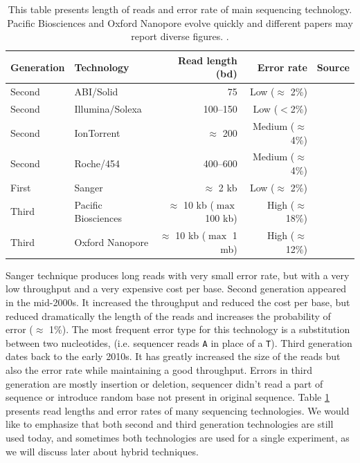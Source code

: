 \documentclass[./main.tex]{subfiles}
\begin{document}
\begin{table}[ht]
    \centering
    \begin{tabular}{ll|rr|l}
Generation & Technology          & Read length (bd)                 & Error rate             & Source                          \\ \hline
Second     & ABI/Solid           & 75                               & Low ($\approx$ 2\%)    & \cite{seq_assembly_demystified} \\
Second     & Illumina/Solexa     & 100–150                          & Low ($<$2\%)             & \cite{seq_assembly_demystified} \\
Second     & IonTorrent          & $\approx$ 200                    & Medium ($\approx$ 4\%) & \cite{seq_assembly_demystified} \\
Second     & Roche/454           & 400–600                          & Medium ($\approx$ 4\%) & \cite{seq_assembly_demystified} \\
First      & Sanger              & $\approx$ 2 kb                   & Low ($\approx$ 2\%)    & \cite{seq_assembly_demystified} \\
Third      & Pacific Biosciences & $\approx$ 10 kb ($\max$ 100 kb)  & High ($\approx$ 18\%)  & \cite{seq_assembly_demystified} \cite{longread_dark_matter} \\
Third      & Oxford Nanopore     & $\approx$ 10 kb ($\max$ 1 mb)    & High ($\approx$ 12\%)  & \cite{longread_dark_matter} \cite{nanopore_read_accuracy} \\
    \end{tabular}
    \caption{This table presents length of reads and error rate of main sequencing technology. Pacific Biosciences and Oxford Nanopore evolve quickly and different papers may report diverse figures.
    .}
    \label{intro:tab:technology_property}
\end{table}

Sanger technique produces long reads with very small error rate, but with a very low throughput and a very expensive cost per base. %
Second generation appeared in the mid-2000s. It increased the throughput and reduced the cost per base, but reduced dramatically the length of the reads and increases the probability of error ($\approx$ 1\%). %
The most frequent error type for this technology is a substitution between two nucleotides, (i.e. sequencer reads \texttt{A} in place of a \texttt{T}). %
Third generation dates back to the early 2010s. It has greatly increased the size of the reads but also the error rate while maintaining a good throughput. %
Errors in third generation are mostly insertion or deletion, sequencer didn't read a part of sequence or introduce random base not present in original sequence. Table \ref{intro:tab:technology_property} presents read lengths and error rates of many sequencing technologies. %
We would like to emphasize that both second and third generation technologies are still used today, and sometimes both technologies are used for a single experiment, as we will discuss later about hybrid techniques. %
\end{document}
